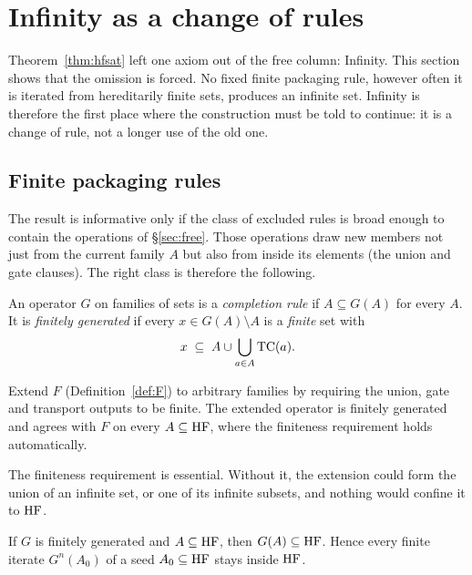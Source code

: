 \section{Infinity as a change of rules}\label{sec:infinity}

Theorem~\ref{thm:hfsat} left one axiom out of the free column: Infinity. This section shows that
the omission is forced. No fixed finite packaging rule, however often it is iterated from
hereditarily finite sets, produces an infinite set. Infinity is therefore the first place where
the construction must be told to continue: it is a change of rule, not a longer use of the old
one.

\subsection{Finite packaging rules}

The result is informative only if the class of excluded rules is broad enough to contain the
operations of \S\ref{sec:free}. Those operations draw new members not just from the current
family $A$ but also from inside its elements (the union and gate clauses). The right class is
therefore the following.

\begin{definition}\label{def:fg}
An operator $G$ on families of sets is a \emph{completion rule} if $A\subseteq G(A)$ for every
$A$. It is \emph{finitely generated} if every $x\in G(A)\setminus A$ is a \emph{finite} set with
\[
  x\;\subseteq\;A\cup\bigcup_{a\in A}\operatorname{TC}(a).
\]
\end{definition}

\begin{lemma}\label{lem:Ffg}
Extend $F$ (Definition~\ref{def:F}) to arbitrary families by requiring the union, gate and
transport outputs to be finite. The extended operator is finitely generated and agrees with $F$
on every $A\subseteq\mathrm{HF}$, where the finiteness requirement holds automatically.
\end{lemma}

The finiteness requirement is essential. Without it, the extension could form the union of an
infinite set, or one of its infinite subsets, and nothing would confine it to $\mathrm{HF}$.

\begin{lemma}\label{lem:hfstable}
If $G$ is finitely generated and $A\subseteq\mathrm{HF}$, then $G(A)\subseteq\mathrm{HF}$. Hence every finite
iterate $G^n(A_0)$ of a seed $A_0\subseteq\mathrm{HF}$ stays inside $\mathrm{HF}$.
\end{lemma}

